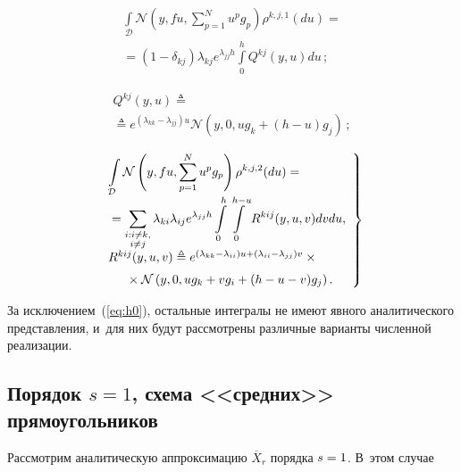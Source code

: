 \begin{multicols}{2}
 \noindent
 \begin{multline*}
 \displaystyle \int\limits_{\mathcal{D}} \mathcal{N}\left(y,f 
u,\sum_{p=1}^N u^p g_p\right) \rho^{k,j,1}(du) ={}\\
{}=(1- \delta_{kj})\lambda_{kj}e^{\lambda_{jj}h}
 \int\limits_0^{h}
 Q^{kj}(y,u)du\,;
 \end{multline*}
 
 \vspace*{-12pt}
 
 \noindent
 \begin{multline*}
  Q^{kj}(y,u) \triangleq{}\\
 {}\triangleq e^{(\lambda_{kk}-\lambda_{jj})u}
 \mathcal{N}\left(y,0, u g_k+(h-u)g_j\right)\,;
 \end{multline*}
 
 \noindent
\begin{equation}
\left.
\begin{array}{l}
\displaystyle
\int\limits_{\mathcal{D}} \mathcal{N}\left(y,f u,\sum\limits_{p=1}^N u^p 
g_p\right) \rho^{k,j,2}(du) ={}\\[6pt]
{}=\displaystyle
 \sum\limits_{\substack{{i:i \neq k,}\\ {i \neq j}}} \lambda_{k 
i}\lambda_{i j} e^{\lambda_{jj}h}
\int\limits_0^{h} \int\limits_0^{h-u} R^{kij}(y,u,v)dvdu,\\[6pt]
R^{kij}(y,u,v) \triangleq
e^{(\lambda_{kk}-\lambda_{i i})u+(\lambda_{i i}-\lambda_{jj})v}\times{}\\[6pt]
\hspace*{5mm}{}\times
\mathcal{N}\left(y,0,
 u g_k+v g_{i} + (h - u - v )g_j
 \right).
 \end{array}
\right\}
 \label{eq:h2}
 \end{equation}
 
За исключением~(\ref{eq:h0}), остальные интегралы не имеют явного 
аналитического представления, и~для них будут рассмотрены различные 
варианты чис\-лен\-ной реализации.

\vspace*{-10pt}

 \subsection{Порядок $s=1$, схема <<средних>> прямоугольников}
 
 \vspace*{-2pt}
 
 Рассмотрим аналитическую аппроксимацию $\overline{X}_r$ порядка 
$s\hm=1$.
 В~этом случае
 

\end{multicols}
